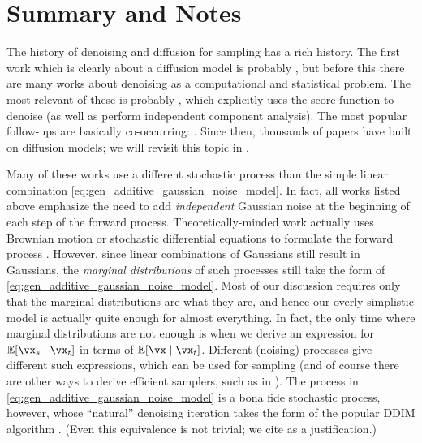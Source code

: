 \documentclass[../../book-main.tex]{subfiles}
\begin{document}

\section{Summary and Notes}

The history of denoising and diffusion for sampling has a rich history. The first work which is clearly about a diffusion model is probably \cite{Sohl-Dickstein2015}, but before this there are many works about denoising as a computational and statistical problem. The most relevant of these is probably \cite{hyvarinen05a}, which explicitly uses the score function to denoise (as well as perform independent component analysis). The most popular follow-ups are basically co-occurring: \cite{ho2020denoising,song2019}. Since then, thousands of papers have built on diffusion models; we will revisit this topic in .

Many of these works use a different stochastic process than the simple linear combination \eqref{eq:gen_additive_gaussian_noise_model}. In fact, all works listed above emphasize the need to add \textit{independent} Gaussian noise at the beginning of each step of the forward process. Theoretically-minded work actually uses Brownian motion or stochastic differential equations to formulate the forward process \cite{song2020score}. However, since linear combinations of Gaussians still result in Gaussians, the \textit{marginal distributions} of such processes still take the form of \eqref{eq:gen_additive_gaussian_noise_model}. Most of our discussion requires only that the marginal distributions are what they are, and hence our overly simplistic model is actually quite enough for almost everything. In fact, the only time where marginal distributions are not enough is when we derive an expression for \(\Ex[\vx_{s} \mid \vx_{t}]\) in terms of \(\Ex[\vx \mid \vx_{t}]\). Different (noising) processes give different such expressions, which can be used for sampling (and of course there are other ways to derive efficient samplers, such as in \cite{song2020score}). The process in \eqref{eq:gen_additive_gaussian_noise_model} is a bona fide stochastic process, however, whose ``natural'' denoising iteration takes the form of the popular DDIM algorithm \cite{song2020denoising}. (Even this equivalence is not trivial; we cite \cite{de2025distributional} as a justification.) 
\end{document}
